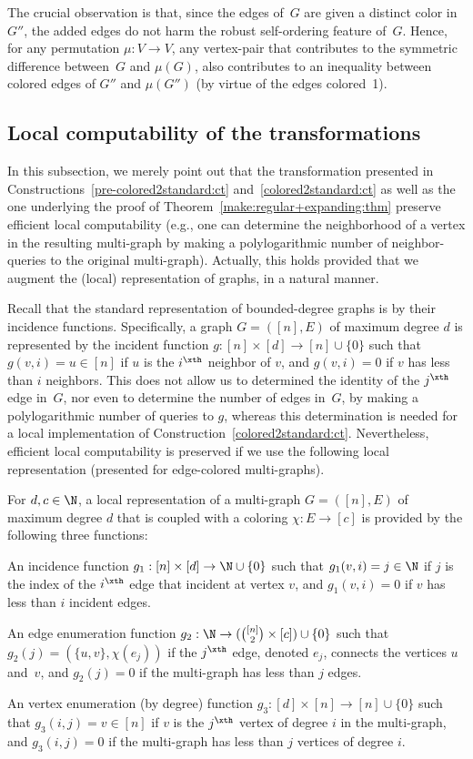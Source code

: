 The crucial observation is that, since the edges of~$G$
are given a distinct color in $G''$, the added edges
do not harm the robust self-ordering feature of~$G$.
Hence, for any permutation $\mu:V\to V$,
any vertex-pair that contributes to the symmetric difference
between~$G$ and $\mu(G)$, also contributes to an inequality
between colored edges of $G''$ and $\mu(G'')$
(by virtue of the edges colored~1).
\EPF


\subsection{Local computability of the transformations}
\label{edge-colored:local:sec}
In this subsection, we merely point out that the transformation
presented in Constructions~\ref{pre-colored2standard:ct}
and~\ref{colored2standard:ct} as well as the one underlying
the proof of Theorem~\ref{make:regular+expanding:thm}
preserve efficient local computability
(e.g., one can determine the neighborhood of a vertex in
the resulting multi-graph by making a polylogarithmic number
of neighbor-queries to the original multi-graph).
Actually, this holds provided that we augment the
(local) representation of graphs, in a natural manner.

Recall that the standard representation of bounded-degree graphs
is by their incidence functions.
Specifically, a graph $G=([n],E)$ of maximum degree $d$ is represented
by the {\sf incident function} $g:[n]\times[d]\to[n]\cup\{0\}$
such that $g(v,i)=u\in[n]$ if $u$ is the $i^\xth$ neighbor of $v$,
and $g(v,i)=0$ if $v$ has less than $i$ neighbors.
This does not allow us to determined the identity of the $j^\xth$
edge in~$G$, nor even to determine the number of edges in~$G$,
by making a polylogarithmic number of queries to $g$,
whereas this determination is needed for
a local implementation of Construction~\ref{colored2standard:ct}.
Nevertheless, efficient local computability is preserved
if we use the following local representation
(presented for edge-colored multi-graphs).

%
For $d,c\in\N$, a {\sf local representation}
of a multi-graph $G=([n],E)$ of maximum degree $d$
that is coupled with a coloring $\chi\!:\!E\!\to\![c]$
is provided by the following three functions:
\BE
\item
An incidence function $g_1:[n]\times[d]\to\N\cup\{0\}$
such that $g_1(v,i)=j\in\N$
if $j$ is the index of the $i^\xth$ edge that incident at vertex $v$,
and $g_1(v,i)=0$ if $v$ has less than $i$ incident edges.
\item
An edge enumeration function $g_2:\N\to(\binom{[n]}{2}\times[c])\cup\{0\}$
such that $g_2(j)=(\{u,v\},\chi(e_j))$ if the $j^\xth$ edge,
denoted $e_j$, connects the vertices $u$ and~$v$,
and $g_2(j)=0$ if the multi-graph has less than $j$ edges.
\item
An vertex enumeration {\rm(by degree)}
function $g_3:[d]\times[n]\to[n]\cup\{0\}$
such that $g_3(i,j)=v\in[n]$
if $v$ is the $j^\xth$ vertex of degree $i$ in the multi-graph,
and $g_3(i,j)=0$ if the multi-graph has less than $j$ vertices of degree $i$.
\EE
\ED

